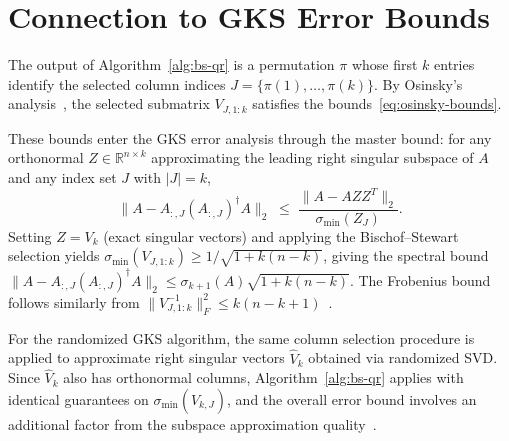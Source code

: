 \documentclass[11pt]{article}
\theoremstyle{definition}
\theoremstyle{remark}
\newcommand{\R}{\mathbb{R}}
\newcommand{\smin}{\sigma_{\min}}
\newcommand{\fnorm}[1]{\lVert #1 \rVert_F}
\newcommand{\tnorm}[1]{\lVert #1 \rVert_2}
\begin{document}
\section{Connection to GKS Error Bounds}
\label{sec:connection}

The output of Algorithm~\ref{alg:bs-qr} is a permutation $\pi$ whose
first $k$ entries identify the selected column indices $J = \{\pi(1),
\ldots, \pi(k)\}$.  By Osinsky's
analysis~\cite{osinsky2025close}, the selected submatrix
$V_{J,1:k}$ satisfies the bounds~\eqref{eq:osinsky-bounds}.

These bounds enter the GKS error analysis through the master bound: for
any orthonormal $Z \in \R^{n \times k}$ approximating the leading
right singular subspace of $A$ and any index set $J$ with $|J| = k$,
\[
  \tnorm{A - A_{:,J}(A_{:,J})^\dagger A}
  \;\leq\;
  \frac{\tnorm{A - AZZ^T}}{\smin(Z_J)}.
\]
Setting $Z = V_k$ (exact singular vectors) and applying the
Bischof--Stewart selection yields
$\smin(V_{J,1:k}) \geq 1/\sqrt{1 + k(n-k)}$, giving the spectral
bound $\tnorm{A - A_{:,J}(A_{:,J})^\dagger A} \leq
\sigma_{k+1}(A)\sqrt{1 + k(n-k)}$.  The Frobenius bound follows
similarly from
$\fnorm{V_{J,1:k}^{-1}}^2 \leq k(n-k+1)$~\cite{armstrong2025structure}.

For the randomized GKS algorithm, the same column selection procedure
is applied to approximate right singular vectors $\hat{V}_k$ obtained
via randomized SVD\@.  Since $\hat{V}_k$ also has orthonormal columns,
Algorithm~\ref{alg:bs-qr} applies with identical guarantees on
$\smin(\hat{V}_{k,J})$, and the overall error bound involves an
additional factor from the subspace approximation
quality~\cite{halko_finding_structure_with_randomness}.



\end{document}
